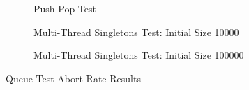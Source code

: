 \begin{table}[H]
\begin{figure}[H]
    \centering
    
    \caption*{Push-Pop Test}
\end{figure}
\begin{figure}[H]
    \centering
        
    \caption*{Multi-Thread Singletons Test: Initial Size 10000}
\end{figure}
\begin{figure}[H]
    \centering
    
    \caption*{Multi-Thread Singletons Test: Initial Size 100000}
\end{figure}
    \caption{Queue Test Abort Rate Results}
\end{table}
